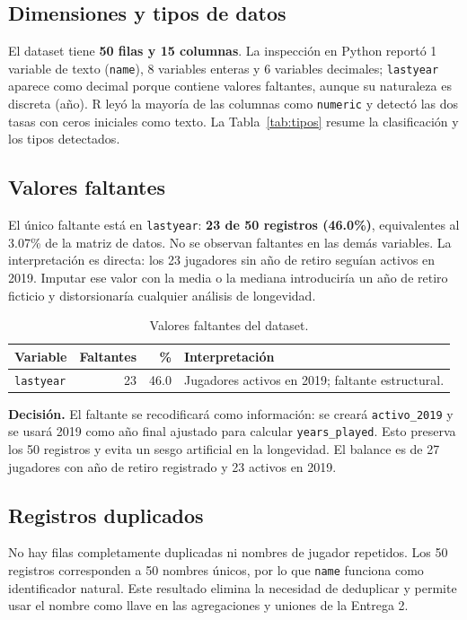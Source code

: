 \documentclass[11pt,a4paper]{article}
\begin{document}
\subsection{Dimensiones y tipos de datos}
El dataset tiene \textbf{50 filas y 15 columnas}. La inspección en Python reportó 1 variable de texto (\texttt{name}), 8 variables enteras y 6 variables decimales; \texttt{lastyear} aparece como decimal porque contiene valores faltantes, aunque su naturaleza es discreta (año). R leyó la mayoría de las columnas como \texttt{numeric} y detectó las dos tasas con ceros iniciales como texto. La Tabla~\ref{tab:tipos} resume la clasificación y los tipos detectados.

\subsection{Valores faltantes}
El único faltante está en \texttt{lastyear}: \textbf{23 de 50 registros (46.0\%)}, equivalentes al 3.07\% de la matriz de datos. No se observan faltantes en las demás variables. La interpretación es directa: los 23 jugadores sin año de retiro seguían activos en 2019. Imputar ese valor con la media o la mediana introduciría un año de retiro ficticio y distorsionaría cualquier análisis de longevidad.

\begin{table}[H]
\centering
\small
\begin{tabularx}{\textwidth}{@{}p{2.4cm}rrL@{}}
\toprule
\textbf{Variable} & \textbf{Faltantes} & \textbf{\%} & \textbf{Interpretación} \\
\midrule
\texttt{lastyear} & 23 & 46.0 & Jugadores activos en 2019; faltante estructural. \\
\bottomrule
\end{tabularx}
\caption{Valores faltantes del dataset.}
\label{tab:faltantes}
\end{table}

\textbf{Decisión.} El faltante se recodificará como información: se creará \texttt{activo\_2019} y se usará 2019 como año final ajustado para calcular \texttt{years\_played}. Esto preserva los 50 registros y evita un sesgo artificial en la longevidad. El balance es de 27 jugadores con año de retiro registrado y 23 activos en 2019.

\subsection{Registros duplicados}
No hay filas completamente duplicadas ni nombres de jugador repetidos. Los 50 registros corresponden a 50 nombres únicos, por lo que \texttt{name} funciona como identificador natural. Este resultado elimina la necesidad de deduplicar y permite usar el nombre como llave en las agregaciones y uniones de la Entrega 2.
\end{document}
